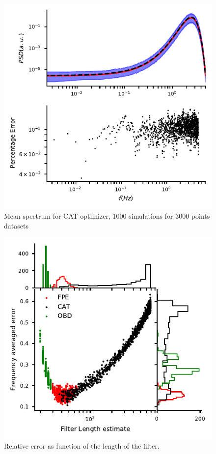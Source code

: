 \documentclass[twocolumn,showpacs,preprintnumbers,nofootinbib,prd,
superscriptaddress,10pt]{revtex4-1}
\begin{document}
\begin{figure}[t]
	\centering
	\includegraphics[width = \linewidth]{Images/optimisers_comparison/normal/CAT_spectrum_estim.pdf}
	\caption{Mean spectrum for CAT optimizer, 1000 simulations for 3000 points datasets}
	\label{fig:CATmean}
\end{figure} 

\begin{figure}
	\centering
	\includegraphics[width = \linewidth]{Images/optimisers_comparison/normal/error_length_contour.pdf}
	\caption{Relative error as function of the length of the filter.}
	\label{fig:optcomparison}
\end{figure}
\end{document}
